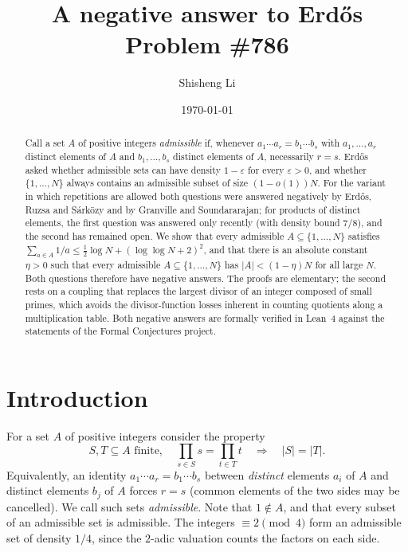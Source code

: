 \documentclass[11pt]{amsart}
\title{A negative answer to Erd\H{o}s Problem \#786}
\author{Shisheng Li}
\date{\today}
\theoremstyle{definition}
\theoremstyle{remark}
\newcommand{\abs}[1]{\lvert #1\rvert}
\begin{document}
\begin{abstract}
Call a set $A$ of positive integers \emph{admissible} if, whenever $a_1\cdots a_r=b_1\cdots b_s$ with $a_1,\dots,a_r$ distinct elements of $A$ and $b_1,\dots,b_s$ distinct elements of $A$, necessarily $r=s$. Erd\H{o}s asked whether admissible sets can have density $1-\varepsilon$ for every $\varepsilon>0$, and whether $\{1,\dots,N\}$ always contains an admissible subset of size $(1-o(1))N$. For the variant in which repetitions are allowed both questions were answered negatively by Erd\H{o}s, Ruzsa and S\'ark\"ozy and by Granville and Soundararajan; for products of distinct elements, the first question was answered only recently (with density bound $7/8$), and the second has remained open. We show that every admissible $A\subseteq\{1,\dots,N\}$ satisfies $\sum_{a\in A}1/a\le\frac12\log N+(\log\log N+2)^2$, and that there is an absolute constant $\eta>0$ such that every admissible $A\subseteq\{1,\dots,N\}$ has $\abs{A}<(1-\eta)N$ for all large $N$. Both questions therefore have negative answers. The proofs are elementary; the second rests on a coupling that replaces the largest divisor of an integer composed of small primes, which avoids the divisor-function losses inherent in counting quotients along a multiplication table. Both negative answers are formally verified in Lean~4 against the statements of the Formal Conjectures project.
\end{abstract}

\maketitle

\section{Introduction}

For a set $A$ of positive integers consider the property
\begin{equation}\tag{P}
S,T\subseteq A \text{ finite},\quad \prod_{s\in S}s=\prod_{t\in T}t\quad\Longrightarrow\quad\abs{S}=\abs{T}.
\end{equation}
Equivalently, an identity $a_1\cdots a_r=b_1\cdots b_s$ between \emph{distinct} elements $a_i$ of $A$ and distinct elements $b_j$ of $A$ forces $r=s$ (common elements of the two sides may be cancelled). We call such sets \emph{admissible}. Note that $1\notin A$, and that every subset of an admissible set is admissible. The integers $\equiv2\pmod 4$ form an admissible set of density $1/4$, since the $2$-adic valuation counts the factors on each side.
\end{document}
